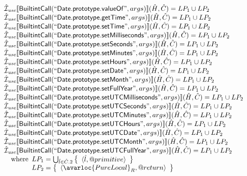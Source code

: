 \[
\begin{array}{l}
\aI_{\it use}\lbr \SF{BuiltintCall}(``\SF{Date.prototype.valueOf}",args)\rbr(\hat{H},\hat{C}) = LP_1 \cup LP_2\\
\aI_{\it use}\lbr \SF{BuiltintCall}(``\SF{Date.prototype.getTime}",args)\rbr(\hat{H},\hat{C}) = LP_1 \cup LP_2\\
\aI_{\it use}\lbr \SF{BuiltintCall}(``\SF{Date.prototype.setTime}",args)\rbr(\hat{H},\hat{C}) = LP_1 \cup LP_2\\
\aI_{\it use}\lbr \SF{BuiltintCall}(``\SF{Date.prototype.setMilliseconds}",args)\rbr(\hat{H},\hat{C}) = LP_1 \cup LP_2\\
\aI_{\it use}\lbr \SF{BuiltintCall}(``\SF{Date.prototype.setSeconds}",args)\rbr(\hat{H},\hat{C}) = LP_1 \cup LP_2\\
\aI_{\it use}\lbr \SF{BuiltintCall}(``\SF{Date.prototype.setMinutes}",args)\rbr(\hat{H},\hat{C}) = LP_1 \cup LP_2\\
\aI_{\it use}\lbr \SF{BuiltintCall}(``\SF{Date.prototype.setHours}",args)\rbr(\hat{H},\hat{C}) = LP_1 \cup LP_2\\
\aI_{\it use}\lbr \SF{BuiltintCall}(``\SF{Date.prototype.setDate}",args)\rbr(\hat{H},\hat{C}) = LP_1 \cup LP_2\\
\aI_{\it use}\lbr \SF{BuiltintCall}(``\SF{Date.prototype.setMonth}",args)\rbr(\hat{H},\hat{C}) = LP_1 \cup LP_2\\
\aI_{\it use}\lbr \SF{BuiltintCall}(``\SF{Date.prototype.setFullYear}",args)\rbr(\hat{H},\hat{C}) = LP_1 \cup LP_2\\
\aI_{\it use}\lbr \SF{BuiltintCall}(``\SF{Date.prototype.setUTCMilliseconds}",args)\rbr(\hat{H},\hat{C}) = LP_1 \cup LP_2\\
\aI_{\it use}\lbr \SF{BuiltintCall}(``\SF{Date.prototype.setUTCSeconds}",args)\rbr(\hat{H},\hat{C}) = LP_1 \cup LP_2\\
\aI_{\it use}\lbr \SF{BuiltintCall}(``\SF{Date.prototype.setUTCMinutes}",args)\rbr(\hat{H},\hat{C}) = LP_1 \cup LP_2\\
\aI_{\it use}\lbr \SF{BuiltintCall}(``\SF{Date.prototype.setUTCHours}",args)\rbr(\hat{H},\hat{C}) = LP_1 \cup LP_2\\
\aI_{\it use}\lbr \SF{BuiltintCall}(``\SF{Date.prototype.setUTCDate}",args)\rbr(\hat{H},\hat{C}) = LP_1 \cup LP_2\\
\aI_{\it use}\lbr \SF{BuiltintCall}(``\SF{Date.prototype.setUTCMonth}",args)\rbr(\hat{H},\hat{C}) = LP_1 \cup LP_2\\
\aI_{\it use}\lbr \SF{BuiltintCall}(``\SF{Date.prototype.setUTCFullYear}",args)\rbr(\hat{H},\hat{C}) = LP_1 \cup LP_2\\
\quad\wherec{
  LP_1 = \bigcup_{\hat{l} \in \hat{C}.2} \set{\langle \hat{l}, \varprop{primitive}\rangle}\\
  LP_2 = \set{\langle\avarloc{PureLocal}_R,\varprop{return}\rangle}\\
  }\\
\\

\end{array}
\]


